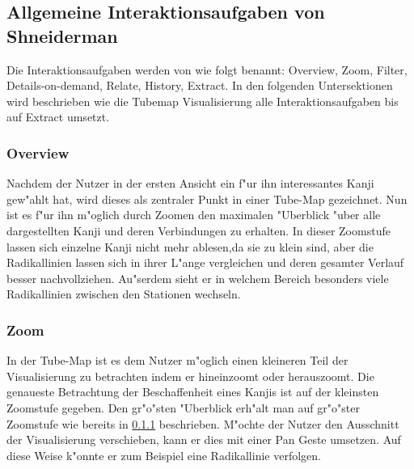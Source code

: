 \subsection{Allgemeine Interaktionsaufgaben von Shneiderman}
Die Interaktionsaufgaben werden von \cite{eyeshaveit96} wie folgt benannt: Overview, Zoom, Filter, Details-on-demand, Relate, History, Extract. In den folgenden Untersektionen wird beschrieben wie die Tubemap Visualisierung alle Interaktionsaufgaben bis auf Extract umsetzt. 

\subsubsection{Overview}\label{Overview}
Nachdem der Nutzer in der ersten Ansicht ein f"ur ihn interessantes Kanji gew"ahlt hat, wird dieses als zentraler Punkt in einer Tube-Map gezeichnet. Nun ist es f"ur ihn m"oglich durch Zoomen den maximalen "Uberblick "uber alle dargestellten Kanji und deren Verbindungen zu erhalten. In dieser Zoomstufe lassen sich einzelne Kanji nicht mehr ablesen,da sie zu klein sind, aber die Radikallinien lassen sich in ihrer L"ange vergleichen und deren gesamter Verlauf besser nachvollziehen. Au"serdem sieht er in welchem Bereich besonders viele Radikallinien zwischen den Stationen wechseln.

\subsubsection{Zoom}
In der Tube-Map ist es dem Nutzer m"oglich einen kleineren Teil der Visualisierung zu betrachten indem er hineinzoomt oder herauszoomt. Die genaueste Betrachtung der Beschaffenheit eines Kanjis ist auf der kleinsten Zoomstufe gegeben. Den gr"o"sten "Uberblick erh"alt man auf gr"o"ster Zoomstufe wie bereits in \ref{Overview} beschrieben. M"ochte der Nutzer den Ausschnitt der Visualisierung verschieben, kann er dies mit einer Pan Geste umsetzen. Auf diese Weise k"onnte er zum Beispiel eine Radikallinie verfolgen.

